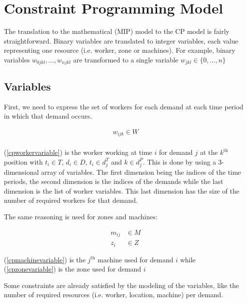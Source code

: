 \documentclass[../../thesis.tex]{subfiles}
\begin{document}
\section{Constraint Programming Model}

The translation to the mathematical (MIP) model to the CP model is fairly
straightforward. Binary variables are translated to integer variables, each value representing
one resource (i.e. worker, zone or machines). 
For example, binary variables $w_{0jkl}, \dots, w_{njkl}$ are transformed to a single variable 
$w_{jkl} \in \{0, \dots, n\}$



\subsection{Variables}

First, we need to express the set of workers for each demand at each time period in which that demand occurs.

\begin{equation}
\begin{split}
    w_{ijk} \in W \label{cpworkervariable} \\
\end{split}
\end{equation}

(\ref{cpworkervariable}) is the worker working at time $i$ for demand $j$ at the $k^{\text{th}}$ position 
with $t_i \in T$, $d_i \in D$, $t_i \in d_j^T$ and $k \in d^P_j$. This is done by using a 3-dimensional array of variables. The first dimension being the indices of the 
time periods, the second dimension is the indices of the demands while the last dimension is the list of worker variables. 
This last dimension has the size of the number of required workers for that demand.

The same reasoning is used for zones and machines:

\begin{align}
    m_{ij} &\in M \label{cpmachinevariable} \\ 
    z_i &\in Z \label{cpzonevariable} 
\end{align}

(\ref{cpmachinevariable}) is the $j^{\text{th}}$ machine used for demand $i$ while (\ref{cpzonevariable}) is the zone used for demand $i$

Some constraints are already satisfied by the modeling of the variables, like the number of required resources (i.e. worker, location, machine)
per demand.
\end{document}
